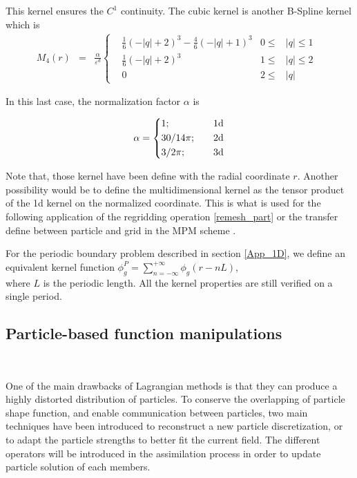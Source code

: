 This kernel ensures the $C^1$ continuity.
The cubic kernel is another B-Spline kernel which is
\begin{eqnarray}~\label{cubic_kernel}
	M_4(r) &=&  \frac{\alpha}{\varepsilon^d} \left\{ \begin{aligned}
		 & \frac{1}{6}{(-|q|+2)}^3 - \frac{4}{6}{(-|q|+1)}^3 & 0 \leq      & |q| \leq  1 & \\
		 & \frac{1}{6}{(- |q|+2)}^3                          & 1      \leq & |q| \leq 2  & \\
		 & 0                                                 & 2 \leq      & |q|
	\end{aligned}
	\right.
\end{eqnarray}

In this last case, the normalization factor $\alpha$ is

\begin{equation*}
	\alpha = \left\{ \begin{aligned}
		 & 1;    \quad      & 1\text d \\
		 & 30/14 \pi; \quad & 2\text d \\
		 & 3/ 2\pi; \quad   & 3\text d
	\end{aligned}
	\right.
\end{equation*}

Note that, those kernel have been define with the radial coordinate $r$. Another possibility would be to define the multidimensional kernel as the tensor product of the 1d kernel on the normalized coordinate. This is what is used for the following application of the regridding operation \ref{remesh_part} or the transfer define between particle and grid in the MPM scheme \cite{sulsky_particle_1994,jiang_affine_2015}.

For the periodic boundary problem described in section \ref{App_1D}, we define an equivalent kernel function $\phi^P_g = \sum_{n=-\infty}^{+\infty} \phi_g(r - n L)$, \\ where $L$ is the periodic length. All the kernel properties are still verified on a single period.

\subsection{Particle-based function manipulations}~\label{operators}

One of the main drawbacks of Lagrangian methods is that they can produce a highly distorted distribution of particles. To conserve the overlapping of particle shape function, and enable communication between particles, two main techniques have been introduced to reconstruct a new particle discretization, or to adapt the particle strengths to better fit the current field.
The different operators will be introduced in the assimilation process in order to update particle solution of each members.

